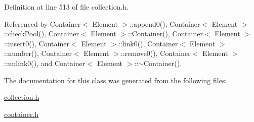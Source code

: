 Definition at line 513 of file collection.h.

Referenced by Container$<$ Element $>$::append0(), Container$<$ Element $>$::checkPool(), Container$<$ Element $>$::Container(), Container$<$ Element $>$::insert0(), Container$<$ Element $>$::link0(), Container$<$ Element $>$::number(), Container$<$ Element $>$::remove0(), Container$<$ Element $>$::unlink0(), and Container$<$ Element $>$::$\sim$Container().

The documentation for this class was generated from the following files:\begin{CompactItemize}
\item 
\hyperlink{collection_8h}{collection.h}\item 
\hyperlink{container_8h}{container.h}\end{CompactItemize}
